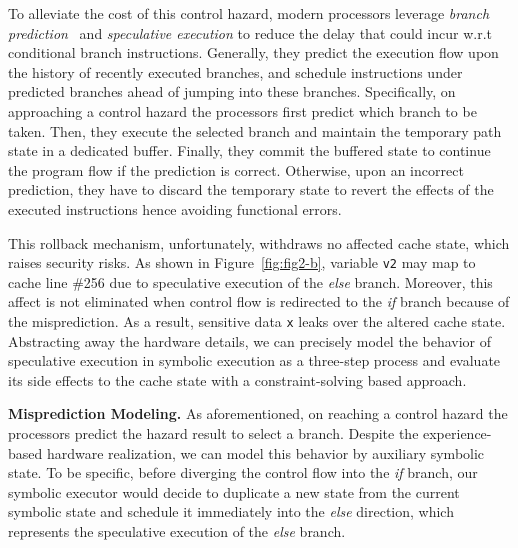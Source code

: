 \documentclass[sigconf]{acmart}
\newcommand\ignore[1]{}
\begin{document}
To alleviate the cost of this control hazard, modern processors leverage 
\textit{branch prediction}~\cite{Mittal19} and \textit{speculative execution}
\cite{kimuraKT1996} to reduce the delay that could incur w.r.t conditional branch 
instructions. Generally, they predict the execution flow upon the history of 
recently executed branches, and schedule instructions under predicted branches
ahead of jumping into these branches. 
Specifically, on approaching a control hazard the processors first predict which 
branch to be taken. Then, they execute the selected branch and maintain the 
temporary path state in a dedicated buffer. Finally, they commit the buffered 
state to continue the program flow if the prediction is correct. Otherwise, upon 
an incorrect prediction, they have to discard the temporary state to revert the 
effects of the executed instructions hence avoiding functional errors. 


This rollback mechanism, unfortunately, withdraws no affected cache state, which 
raises security risks. As shown in Figure~\ref{fig:fig2-b}, variable \texttt{v2} 
may map to cache line \#256 due to speculative execution of the \textit{else} 
branch. Moreover, this affect is not eliminated when control flow is redirected
to the \textit{if} branch because of the misprediction. As a result, sensitive
data \texttt{x} leaks over the altered cache state. 
Abstracting away the hardware details, we can precisely model the behavior of 
speculative execution in symbolic execution as a three-step process and evaluate
its side effects to the cache state with a constraint-solving based approach. 


\textbf{Misprediction Modeling.}
As aforementioned, on reaching a control hazard the processors predict the hazard
result to select a branch. Despite the experience-based hardware realization, we 
can model this behavior by auxiliary symbolic state. To be specific, before 
diverging the control flow into the \textit{if} branch, our symbolic executor 
would decide to duplicate a new state from the current symbolic state and schedule
it immediately into the \textit{else} direction, which represents the speculative 
execution of the \textit{else} branch. 


\ignore{
Note that we only model speculative execution at branches where both \textit{if} 
and \textit{else} decisions are feasible in terms of the branch conditions. The 
assumption considers the situation where the hazard is dependent on the computation 
over input and cannot be inferred as a \textit{true} or a \textit{false} value in 
advance. In contrast, if the condition is determined to be \textit{true} or 
\textit{false} at the branch point, e.g., the \textit{while} loop head in Figure
\ref{fig:fig2-a}, then the branch decision is deterministic.
}
\end{document}
